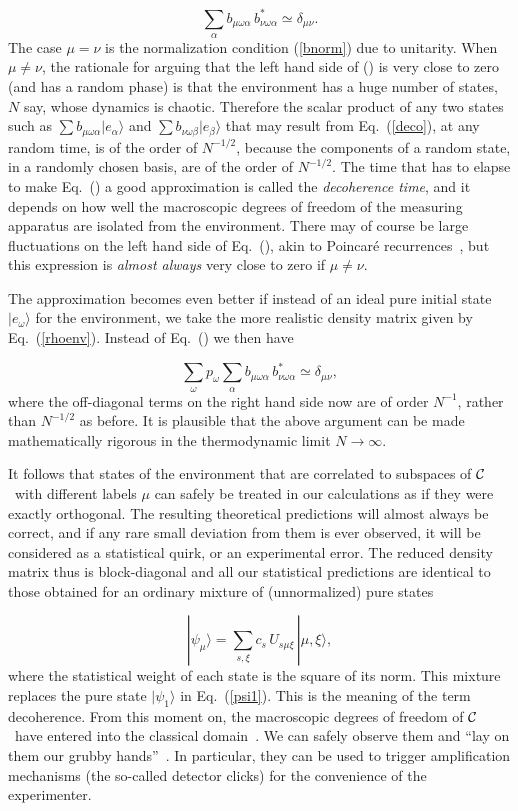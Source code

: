 \documentclass[12pt]{article}
\def\beq{\begin{equation}}
\def\eeq{\end{equation}}
\def\Eq{Eq.~(\ref}
\def\9{\rangle}
\def\cC{$\cal C$}
\begin{document}
\beq \sum_\alpha b_{\mu\omega\alpha}\,b^*_{\nu\omega\alpha}\simeq
  \delta_{\mu\nu}. \label{decohe} \eeq
The case $\mu=\nu$ is the normalization condition (\ref{bnorm}) due to
unitarity. When $\mu\neq\nu$, the rationale for arguing that the left
hand side of (\theequation) is very close to zero (and has a random
phase) is that the environment has a huge number of states, $N$ say,
whose dynamics is chaotic. Therefore the scalar product of any two
states such as $\sum b_{\mu\omega\alpha}|e_\alpha\9$ and $\sum
b_{\nu\omega\beta}|e_\beta\9$ that may result from \Eq{deco}), at any
random time, is of the order of $N^{-1/2}$, because the components of a
random state, in a randomly chosen basis, are of the order of
$N^{-1/2}$. The time that has to elapse to make Eq.~(\theequation) a
good approximation is called the {\it decoherence time\/}, and it
depends on how well the macroscopic degrees of freedom of the measuring
apparatus are isolated from the environment. There may of course be
large fluctuations on the left hand side of Eq.~(\theequation), akin to
Poincar\'e recurrences~\cite{schul}, but this expression is {\it almost
always\/} very close to zero if $\mu\neq\nu$.

The approximation becomes even better if instead of an ideal pure
initial state $|e_\omega\9$ for the environment, we take the more
realistic density matrix given by \Eq{rhoenv}). Instead of
Eq.~(\theequation) we then have

\beq \sum_\omega p_\omega \sum_\alpha b_{\mu\omega\alpha}\,
  b^*_{\nu\omega\alpha}\simeq \delta_{\mu\nu}, \eeq
where the off-diagonal terms on the right hand side now are of order
$N^{-1}$, rather than $N^{-1/2}$ as before. It is plausible that the
above argument can be made mathematically rigorous in the thermodynamic
limit $N\to\infty$.

It follows that states of the environment that are correlated to
subspaces of \cC\ with different labels $\mu$ can safely be treated in
our calculations as if they were exactly orthogonal. The resulting
theoretical predictions will almost always be correct, and if any rare
small deviation from them is ever observed, it will be considered as a
statistical quirk, or an experimental error. The reduced density matrix
thus is block-diagonal and all our statistical predictions are identical
to those obtained for an ordinary mixture of (unnormalized) pure states

\beq |\psi_\mu\9=\sum_{s,\xi}c_s\,U_{s\mu\xi}\,|\mu,\xi\9,
 \label{psimu} \eeq
where the statistical weight of each state is the square of its norm.
This mixture replaces the pure state $|\psi_1\9$ in \Eq{psi1}). This is
the meaning of the term decoherence. From this moment on, the
macroscopic degrees of freedom of \cC\ have entered into the classical
domain~\cite{Bohr1939,hay}. We can safely observe them and ``lay on them
our grubby hands''~\cite{caves}. In particular, they can be used to
trigger amplification mechanisms (the so-called detector clicks) for the
convenience of the experimenter. 
\end{document}
